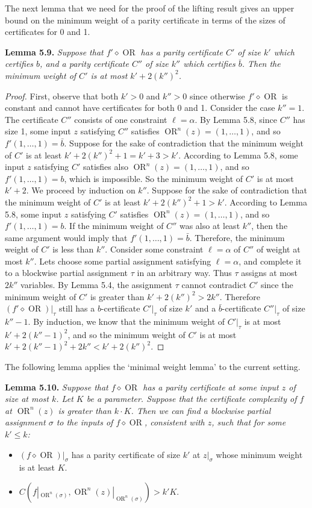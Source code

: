 \documentclass[10pt,a4paper]{article}
\newcommand{\comp}{\diamond}
\newcommand{\OR}{\operatorname{OR}}
\newenvironment{originalresult}[1]{\par\medskip\noindent\textbf{#1.}\itshape}{\par\medskip}
\begin{document}
The next lemma that we need for the proof of the lifting result gives an upper bound on the minimum weight of a parity certificate in terms of the sizes of certificates for 0 and 1.
\begin{originalresult}{Lemma 5.9}
Suppose that $f'\comp\OR$ has a parity certificate $C'$ of size $k'$ which certifies $b$, and a parity certificate $C''$ of size $k''$ which certifies $\bar b$. Then the minimum weight of $C'$ is at most $k'+2(k'')^2$.
\end{originalresult}
\begin{proof}
First, observe that both $k'>0$ and $k''>0$ since otherwise $f'\comp\OR$ is constant and cannot have certificates for both 0 and 1.
Consider the case $k''=1$. The certificate $C''$ consists of one constraint $\ell=\alpha$. By Lemma 5.8, since $C''$ has size 1, some input $z$ satisfying $C''$ satisfies $\OR^n(z)=(1,\ldots,1)$, and so $f'(1,\ldots,1)=\bar b$. Suppose for the sake of contradiction that the minimum weight of $C'$ is at least $k'+2(k'')^2+1=k'+3>k'$. According to Lemma 5.8, some input $z$ satisfying $C'$ satisfies also $\OR^n(z)=(1,\ldots,1)$, and so $f'(1,\ldots,1)=b$, which is impossible. So the minimum weight of $C'$ is at most $k'+2$.
We proceed by induction on $k''$. Suppose for the sake of contradiction that the minimum weight of $C'$ is at least $k'+2(k'')^2+1>k'$. According to Lemma 5.8, some input $z$ satisfying $C'$ satisfies $\OR^n(z)=(1,\ldots,1)$, and so $f'(1,\ldots,1)=b$. If the minimum weight of $C''$ was also at least $k''$, then the same argument would imply that $f'(1,\ldots,1)=\bar b$. Therefore, the minimum weight of $C'$ is less than $k''$. Consider some constraint $\ell=\alpha$ of $C''$ of weight at most $k''$. Lets choose some partial assignment satisfying $\ell=\alpha$, and complete it to a blockwise partial assignment $\tau$ in an arbitrary way. Thus $\tau$ assigns at most $2k''$ variables. By Lemma 5.4, the assignment $\tau$ cannot contradict $C'$ since the minimum weight of $C'$ is greater than $k'+2(k'')^2>2k''$. Therefore $(f'\comp\OR)|_\tau$ still has a $b$-certificate $C'|_\tau$ of size $k'$ and a $\bar b$-certificate $C''|_\tau$ of size $k''-1$. By induction, we know that the minimum weight of $C'|_\tau$ is at most $k'+2(k''-1)^2$, and so the minimum weight of $C'$ is at most $k'+2(k''-1)^2+2k''<k'+2(k'')^2$.
\end{proof}
The following lemma applies the `minimal weight lemma' to the current setting.
\begin{originalresult}{Lemma 5.10}
Suppose that $f\comp\OR$ has a parity certificate at some input $z$ of size at most $k$. Let $K$ be a parameter. Suppose that the certificate complexity of $f$ at $\OR^n(z)$ is greater than $k\cdot K$. Then we can find a blockwise partial assignment $\sigma$ to the inputs of $f\comp\OR$, consistent with $z$, such that for some $k'\le k$:
\begin{itemize}
\item $(f\comp\OR)|_\sigma$ has a parity certificate of size $k'$ at $z|_\sigma$ whose minimum weight is at least $K$.
\item $C(f|_{\OR^n(\sigma)},\OR^n(z)|_{\OR^n(\sigma)})>k'K$.
\end{itemize}
\end{originalresult}
\end{document}
